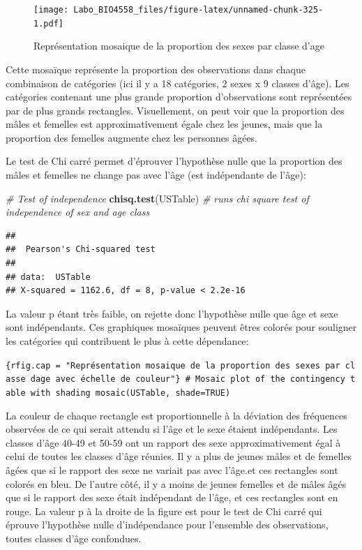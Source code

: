 \documentclass[12pt,]{book}
\newenvironment{Shaded}{\begin{snugshade}}{\end{snugshade}}
\newcommand{\CommentTok}[1]{\textcolor[rgb]{0.56,0.35,0.01}{\textit{#1}}}
\newcommand{\KeywordTok}[1]{\textcolor[rgb]{0.13,0.29,0.53}{\textbf{#1}}}
\newcommand{\NormalTok}[1]{#1}
\begin{document}
\begin{figure}
\centering
\texttt{[image: Labo\_BIO4558\_files/figure-latex/unnamed-chunk-325-1.pdf]}
\caption{\label{fig:unnamed-chunk-325}Représentation mosaique de la proportion des sexes par classe d'age}
\end{figure}

Cette mosaïque représente la proportion des observations dans chaque combinaison de catégories (ici il y a 18 catégories, 2 sexes x 9 classes d'âge). Les catégories contenant une plus grande proportion d'observations sont représentées par de plus grands rectangles. Visuellement, on peut voir que la proportion des mâles et femelles est approximativement égale chez les jeunes, mais que la proportion des femelles augmente chez les personnes âgées.

Le test de Chi carré permet d'éprouver l'hypothèse nulle que la proportion des mâles et femelles ne change pas avec l'âge (est indépendante de l'âge):

\begin{Shaded}
\begin{Highlighting}[]
\CommentTok{# Test of independence}
\KeywordTok{chisq.test}\NormalTok{(USTable) }\CommentTok{# runs chi square test of independence of sex and age class}
\end{Highlighting}
\end{Shaded}

\begin{verbatim}
## 
##  Pearson's Chi-squared test
## 
## data:  USTable
## X-squared = 1162.6, df = 8, p-value < 2.2e-16
\end{verbatim}

La valeur p étant très faible, on rejette donc l'hypothèse nulle que âge et sexe sont indépendants. Ces graphiques mosaïques peuvent êtres colorés pour souligner les catégories qui contribuent le plus à cette dépendance:

\texttt{\{rfig.cap\ =\ "Représentation\ mosaique\ de\ la\ proportion\ des\ sexes\ par\ classe\ d\textquotesingle{}age\ avec\ échelle\ de\ couleur"\}\ \#\ Mosaic\ plot\ of\ the\ contingency\ table\ with\ shading\ mosaic(USTable,\ shade=TRUE)}

La couleur de chaque rectangle est proportionnelle à la déviation des fréquences observées de ce qui serait attendu si l'âge et le sexe étaient indépendants. Les classes d'âge 40-49 et 50-59 ont un rapport des sexe approximativement égal à celui de toutes les classes d'âge réunies. Il y a plus de jeunes mâles et de femelles âgées que si le rapport des sexe ne variait pas avec l'âge.et ces rectangles sont colorés en bleu. De l'autre côté, il y a moins de jeunes femelles et de mâles âgés que si le rapport des sexe était indépendant de l'âge, et ces rectangles sont en rouge. La valeur p à la droite de la figure est pour le test de Chi carré qui éprouve l'hypothèse nulle d'indépendance pour l'ensemble des observations, toutes classes d'âge confondues.
\end{document}
